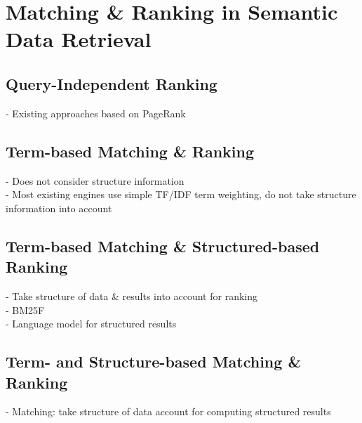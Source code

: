 \section{Matching \& Ranking in Semantic Data Retrieval}

\subsection{Query-Independent Ranking}
- Existing approaches based on PageRank

\subsection{Term-based Matching \& Ranking}
- Does not consider structure information \\
- Most existing engines use simple TF/IDF term weighting, do not take structure information into account 

\subsection{Term-based Matching \& Structured-based Ranking}
- Take structure of data \& results into account for ranking\\
-	BM25F\\
- Language model for structured results

\subsection{Term- and Structure-based Matching \& Ranking} 
-	Matching: take structure of data account for computing structured results
